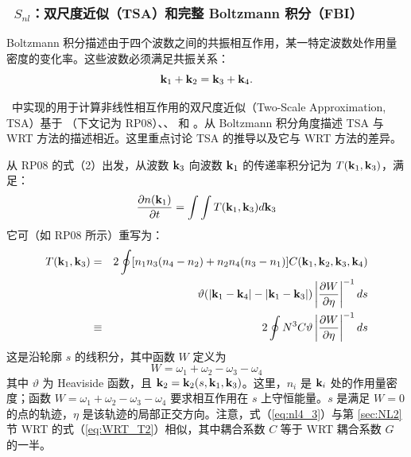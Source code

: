 \vsssub
\subsubsection[~$S_{nl}$：双尺度近似（TSA）]{~$S_{nl}$：双尺度近似（TSA）和完整 Boltzmann 积分（FBI） \label{sec:NL4}}
\vsssub



\noindent
Boltzmann 积分描述由于四个波数之间的共振相互作用，某一特定波数处作用量密度的变化率。这些波数必须满足共振关系：
\begin{equation}
{\bf k}_1 +{\bf k}_2 = {\bf k}_3+{\bf k}_4. 
\end{equation}

\ws\ 中实现的用于计算非线性相互作用的双尺度近似（Two-Scale Approximation, TSA）基于 \cite{art:Resio2008}（下文记为 RP08）、\cite{art:Perrie2009}、\cite{art:Resio2011} 和 \cite{art:Perrie2013}。从 Boltzmann 积分角度描述 TSA 与 WRT 方法的描述相近。这里重点讨论 TSA 的推导以及它与 WRT 方法的差异。

从 RP08 的式（2）出发，从波数 ${\bf k}_3$ 向波数 ${\bf k}_1$ 的传递率积分记为 $T({\bf k}_1,{\bf k}_3 )$，满足：
\begin{equation}
\frac{\partial n({\bf k}_1)}{\partial t} = \int \int T ({\bf k}_1,{\bf k}_3 ) d {\bf k}_3 \label{eq:nl4_2}
\end{equation}    
它可（如 RP08 所示）重写为：
\begin{eqnarray}
T({\bf k}_1,{\bf k}_3 ) &=& 2 \oint [n_1 n_3 (n_4-n_2) +n_2n_4(n_3-n_1)] C({\bf k}_1,{\bf k}_2,{\bf k}_3,{\bf k}_4)\nonumber \\
&& \vartheta (|{\bf k}_1-{\bf k}_4|-|{\bf k}_1-{\bf k}_3|) \left|\frac{\partial W}{\partial \eta}\right|^{-1} ds \nonumber\\
& \equiv & 2 \oint N^3 C \vartheta \left|\frac{\partial W}{\partial \eta}\right|^{-1} ds \label{eq:nl4_3}
\end{eqnarray}
这是沿轮廓 $s$ 的线积分，其中函数 $W$ 定义为
\begin{equation}
W = \omega_1+\omega_2-\omega_3-\omega_4
\end{equation}
其中 $\vartheta$ 为 Heaviside 函数，且 ${\bf k}_2={\bf k}_2(s,{\bf k}_1,{\bf k}_3)$。这里，$n_i$ 是 ${\bf k}_i$ 处的作用量密度；函数 $W = \omega_1+\omega_2-\omega_3-\omega_4$ 要求相互作用在 $s$ 上守恒能量。$s$ 是满足 $W=0$ 的点的轨迹，$\eta$ 是该轨迹的局部正交方向。注意，式（\ref{eq:nl4_3}）与第 \ref{sec:NL2} 节 WRT 的式（\ref{eq:WRT_T2}）相似，其中耦合系数 $C$ 等于 WRT 耦合系数 $G$ 的一半。

